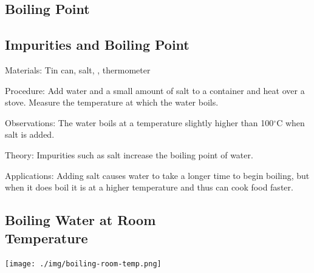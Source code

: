 \begin{multicols}{2}

\section*{Boiling Point}


\subsection{Impurities and Boiling Point}


\begin{description*}
\item[Materials:]{Tin can, salt, , thermometer}
\item[Procedure:]{Add water and a small amount of salt to a container and heat over a stove. Measure the temperature at which the water boils.}
\item[Observations:]{The water boils at a temperature slightly higher than 100$^\circ$C when salt is added.}
\item[Theory:]{Impurities such as salt increase the boiling point of water.}
\item[Applications:]{Adding salt causes water to take a longer time to begin boiling, but when it does boil it is at a higher temperature and thus can cook food faster.}
\end{description*}

\columnbreak

\subsection[Boiling Water at Room Temperature]{Boiling Water at Room \hfill \\ Temperature}

\begin{center}
\texttt{[image: ./img/boiling-room-temp.png]}
\end{center}


\end{multicols}
